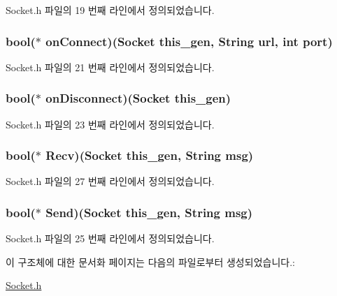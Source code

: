 Socket.\-h 파일의 19 번째 라인에서 정의되었습니다.

\hypertarget{struct___socket_a12fc7a8a0e3742d18dec08defeb67435}{
\subsubsection[{on\-Connect}]{\setlength{\rightskip}{0pt plus 5cm}bool($\ast$  on\-Connect)({\bf Socket} this\-\_\-gen, {\bf String} url, int port)}}\label{struct___socket_a12fc7a8a0e3742d18dec08defeb67435}


Socket.\-h 파일의 21 번째 라인에서 정의되었습니다.

\hypertarget{struct___socket_ad7a809e33935ee525606738714730f7a}{
\subsubsection[{on\-Disconnect}]{\setlength{\rightskip}{0pt plus 5cm}bool($\ast$  on\-Disconnect)({\bf Socket} this\-\_\-gen)}}\label{struct___socket_ad7a809e33935ee525606738714730f7a}


Socket.\-h 파일의 23 번째 라인에서 정의되었습니다.

\hypertarget{struct___socket_a0a7bae2527254e83c0e79cc118dc8744}{
\subsubsection[{Recv}]{\setlength{\rightskip}{0pt plus 5cm}bool($\ast$  Recv)({\bf Socket} this\-\_\-gen, {\bf String} msg)}}\label{struct___socket_a0a7bae2527254e83c0e79cc118dc8744}


Socket.\-h 파일의 27 번째 라인에서 정의되었습니다.

\hypertarget{struct___socket_a0d82d1d1d78c09f2fa3a3e5709527ae5}{
\subsubsection[{Send}]{\setlength{\rightskip}{0pt plus 5cm}bool($\ast$  Send)({\bf Socket} this\-\_\-gen, {\bf String} msg)}}\label{struct___socket_a0d82d1d1d78c09f2fa3a3e5709527ae5}


Socket.\-h 파일의 25 번째 라인에서 정의되었습니다.



이 구조체에 대한 문서화 페이지는 다음의 파일로부터 생성되었습니다.\-:\begin{DoxyCompactItemize}
\item 
\hyperlink{_socket_8h}{Socket.\-h}\end{DoxyCompactItemize}
